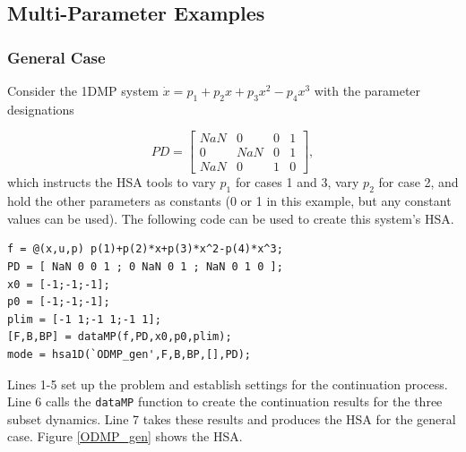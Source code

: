 \documentclass[12pt]{article}
\begin{document}
\subsection{Multi-Parameter Examples}

\subsubsection{General Case}
\label{ODMP}
Consider the 1DMP system $\dot{x}=p_1+p_2x+p_3x^2-p_4x^3$ with the parameter designations

\begin{equation}
PD=\begin{bmatrix}
    NaN & 0 & 0 & 1\\
    0 & NaN & 0 & 1\\
    NaN & 0 & 1 & 0 
\end{bmatrix},
\end{equation}
which instructs the HSA tools to vary $p_1$ for cases 1 and 3, vary $p_2$ for case 2, and hold the other parameters as constants (0 or 1 in this example, but any constant values can be used). The following code can be used to create this system's HSA.

\begin{addmargin}[0.5in]{1em}
\begin{lstlisting}
f = @(x,u,p) p(1)+p(2)*x+p(3)*x^2-p(4)*x^3;
PD = [ NaN 0 0 1 ; 0 NaN 0 1 ; NaN 0 1 0 ];
x0 = [-1;-1;-1]; 
p0 = [-1;-1;-1];
plim = [-1 1;-1 1;-1 1];
[F,B,BP] = dataMP(f,PD,x0,p0,plim);
mode = hsa1D(`ODMP_gen',F,B,BP,[],PD);
\end{lstlisting}
\end{addmargin}

\noindent Lines 1-5 set up the problem and establish settings for the continuation process. Line 6 calls the \texttt{dataMP} function to create the continuation results for the three subset dynamics. Line 7 takes these results and produces the HSA for the general case. Figure \ref{ODMP_gen} shows the HSA.
\end{document}
